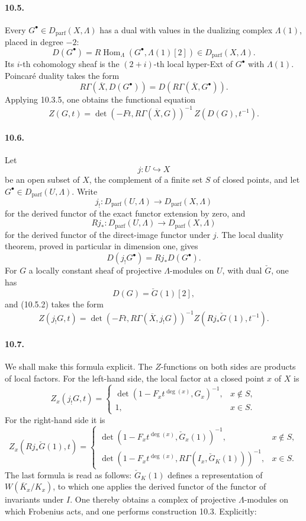 \documentclass[10pt]{article}
\newcommand{\Hom}{\operatorname{Hom}}
\providecommand{\Hom}{\operatorname{Hom}}
\providecommand{\Hom}{\operatorname{Hom}}
\providecommand{\Dparf}{D_{\mathrm{parf}}}
\providecommand{\Hom}{\operatorname{Hom}}
\begin{document}
\paragraph{10.5.} Every \(G^\bullet\in\Dparf(X,\Lambda)\) has a dual with values in the dualizing complex \(\Lambda(1)\), placed in degree \(-2\):
\[
D(G^\bullet)=R\Hom_\Lambda(G^\bullet,\Lambda(1)[2])\in\Dparf(X,\Lambda).
\]
Its \(i\)-th cohomology sheaf is the \((2+i)\)-th local hyper-Ext of \(G^\bullet\) with \(\Lambda(1)\). Poincaré duality takes the form
\[
\tag{10.5.1}
R\Gamma(\overline X,D(G^\bullet))=D(R\Gamma(\overline X,G^\bullet)).
\]
Applying 10.3.5, one obtains the functional equation
\[
\tag{10.5.2}
Z(G,t)=
\det(-Ft,R\Gamma(\overline X,G))^{-1}\,
Z(D(G),t^{-1}).
\]

\paragraph{10.6.} Let
\[
j:U\hookrightarrow X
\]
be an open subset of \(X\), the complement of a finite set \(S\) of closed points, and let \(G^\bullet\in\Dparf(U,\Lambda)\). Write
\[
j_!:\Dparf(U,\Lambda)\longrightarrow\Dparf(X,\Lambda)
\]
for the derived functor of the exact functor extension by zero, and
\[
Rj_*:\Dparf(U,\Lambda)\longrightarrow\Dparf(X,\Lambda)
\]
for the derived functor of the direct-image functor under \(j\). The local duality theorem, proved in particular in dimension one, gives
\[
\tag{10.6.1}
D(j_!G^\bullet)=Rj_*D(G^\bullet).
\]
For \(G\) a locally constant sheaf of projective \(\Lambda\)-modules on \(U\), with dual \(\check G\), one has
\[
D(G)=\check G(1)[2],
\]
and (10.5.2) takes the form
\[
\tag{10.6.2}
Z(j_!G,t)=
\det(-Ft,R\Gamma(\overline X,j_!G))^{-1}
Z(Rj_*\check G(1),t^{-1}).
\]

\paragraph{10.7.} We shall make this formula explicit. The \(Z\)-functions on both sides are products of local factors. For the left-hand side, the local factor at a closed point \(x\) of \(X\) is
\[
Z_x(j_!G,t)=
\begin{cases}
\det(1-F_x t^{\deg(x)},G_x)^{-1},&x\notin S,\\
1,&x\in S.
\end{cases}
\]
For the right-hand side it is
\[
Z_x(Rj_*\check G(1),t)=
\begin{cases}
\det(1-F_x t^{\deg(x)},\check G_x(1))^{-1},&x\notin S,\\
\det(1-F_x t^{\deg(x)},R\Gamma(I_x,\check G_K(1)))^{-1},&x\in S.
\end{cases}
\]
The last formula is read as follows: \(\check G_K(1)\) defines a representation of \(W(\overline K_x/K_x)\), to which one applies the derived functor of the functor of invariants under \(I\). One thereby obtains a complex of projective \(\Lambda\)-modules on which Frobenius acts, and one performs construction 10.3. Explicitly:
\end{document}

